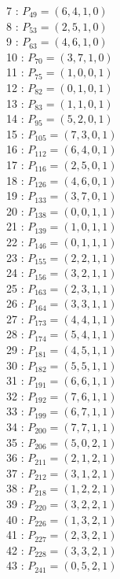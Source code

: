 \documentclass{article}
\begin{document}
{\begin{multicols}{3}
7 : $P_{49}=( 6, 4, 1, 0 )$\\
8 : $P_{53}=( 2, 5, 1, 0 )$\\
9 : $P_{63}=( 4, 6, 1, 0 )$\\
10 : $P_{70}=( 3, 7, 1, 0 )$\\
11 : $P_{75}=( 1, 0, 0, 1 )$\\
12 : $P_{82}=( 0, 1, 0, 1 )$\\
13 : $P_{83}=( 1, 1, 0, 1 )$\\
14 : $P_{95}=( 5, 2, 0, 1 )$\\
15 : $P_{105}=( 7, 3, 0, 1 )$\\
16 : $P_{112}=( 6, 4, 0, 1 )$\\
17 : $P_{116}=( 2, 5, 0, 1 )$\\
18 : $P_{126}=( 4, 6, 0, 1 )$\\
19 : $P_{133}=( 3, 7, 0, 1 )$\\
20 : $P_{138}=( 0, 0, 1, 1 )$\\
21 : $P_{139}=( 1, 0, 1, 1 )$\\
22 : $P_{146}=( 0, 1, 1, 1 )$\\
23 : $P_{155}=( 2, 2, 1, 1 )$\\
24 : $P_{156}=( 3, 2, 1, 1 )$\\
25 : $P_{163}=( 2, 3, 1, 1 )$\\
26 : $P_{164}=( 3, 3, 1, 1 )$\\
27 : $P_{173}=( 4, 4, 1, 1 )$\\
28 : $P_{174}=( 5, 4, 1, 1 )$\\
29 : $P_{181}=( 4, 5, 1, 1 )$\\
30 : $P_{182}=( 5, 5, 1, 1 )$\\
31 : $P_{191}=( 6, 6, 1, 1 )$\\
32 : $P_{192}=( 7, 6, 1, 1 )$\\
33 : $P_{199}=( 6, 7, 1, 1 )$\\
34 : $P_{200}=( 7, 7, 1, 1 )$\\
35 : $P_{206}=( 5, 0, 2, 1 )$\\
36 : $P_{211}=( 2, 1, 2, 1 )$\\
37 : $P_{212}=( 3, 1, 2, 1 )$\\
38 : $P_{218}=( 1, 2, 2, 1 )$\\
39 : $P_{220}=( 3, 2, 2, 1 )$\\
40 : $P_{226}=( 1, 3, 2, 1 )$\\
41 : $P_{227}=( 2, 3, 2, 1 )$\\
42 : $P_{228}=( 3, 3, 2, 1 )$\\
43 : $P_{241}=( 0, 5, 2, 1 )$\\

\end{multicols}}
\end{document}
